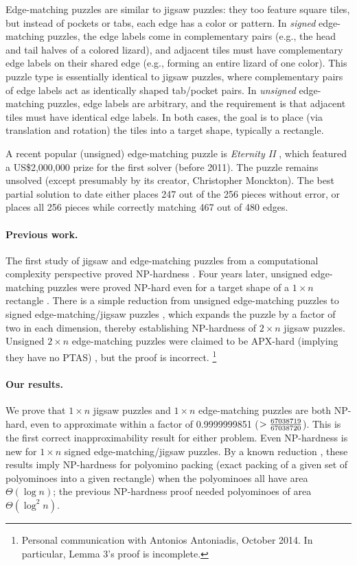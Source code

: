 \documentclass[11pt]{article}
\begin{document}
Edge-matching puzzles are similar to jigsaw puzzles: they too feature
square tiles, but instead of pockets or tabs, each edge has a color or pattern.
In \emph{signed} edge-matching puzzles, the edge labels come in complementary
pairs (e.g., the head and tail halves of a colored lizard), and adjacent tiles
must have complementary edge labels on their shared edge (e.g., forming an
entire lizard of one color).  This puzzle type is essentially identical to
jigsaw puzzles, where complementary pairs of edge labels act as identically
shaped tab/pocket pairs.
In \emph{unsigned} edge-matching puzzles, edge labels are arbitrary, and
the requirement is that adjacent tiles must have identical edge labels.
In both cases, the goal is to place (via translation and rotation) the tiles
into a target shape, typically a rectangle.

A recent popular (unsigned) edge-matching puzzle is \emph{Eternity II}
\cite{eternity2-wiki}, which featured a US\$2,000,000 prize for the first
solver (before 2011).  The puzzle remains unsolved (except presumably by its
creator, Christopher Monckton).  The best partial solution to date
\cite{eternity2-Sydsvenskan} either places 247 out of the 256 pieces without
error, or places all 256 pieces while correctly matching 467 out of 480 edges.

\paragraph{Previous work.}
The first study of jigsaw and edge-matching puzzles from a computational
complexity perspective proved NP-hardness \cite{Jigsaw_GC}.
Four years later, unsigned edge-matching puzzles were
proved NP-hard even for a target shape of a $1 \times n$ rectangle
\cite{EFW11}.
There is a simple reduction from unsigned edge-matching puzzles to
signed edge-matching/jigsaw puzzles \cite{Jigsaw_GC}, which expands the
puzzle by a factor of two in each dimension, thereby establishing NP-hardness
of $2 \times n$ jigsaw puzzles.
Unsigned $2 \times n$ edge-matching puzzles were claimed to be APX-hard
(implying they have no PTAS) \cite{Antoniadis-Lingas-2010}, but the proof
is incorrect.%
%
\footnote{Personal communication with Antonios Antoniadis, October 2014.
  In particular, Lemma 3's proof is incomplete.}

\paragraph{Our results.}
We prove that $1 \times n$ jigsaw puzzles and $1 \times n$ edge-matching
puzzles are both NP-hard, even to approximate within a factor of
0.9999999851 ($ > {67038719 \over 67038720}$).
This is the first correct inapproximability result for either problem.
Even NP-hardness is new for $1 \times n$ signed edge-matching/jigsaw puzzles.
By a known reduction \cite{Jigsaw_GC}, these results imply NP-hardness
for polyomino packing (exact packing of a given set of
polyominoes into a given rectangle) when the polyominoes all have
area $\Theta(\log n)$; the previous NP-hardness proof \cite{Jigsaw_GC}
needed polyominoes of area $\Theta(\log^2 n)$.
\end{document}
